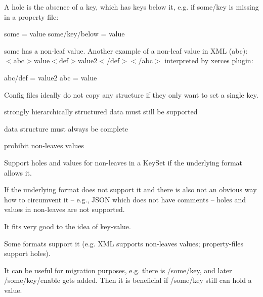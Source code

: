 A hole is the absence of a key, which has keys below it, e.\+g. if {\ttfamily some/key} is missing in a property file\+:


\begin{DoxyCode}
some = value
some/key/below = value
\end{DoxyCode}


{\ttfamily some} has a non-\/leaf value. Another example of a non-\/leaf value in X\+ML ({\ttfamily abc})\+: {\ttfamily $<$abc$>$value$<$def$>$value2$<$/def$>$$<$/abc$>$} interpreted by xerces plugin\+:


\begin{DoxyCode}
abc/def = value2
abc = value
\end{DoxyCode}


Config files ideally do not copy any structure if they only want to set a single key.


\begin{DoxyItemize}
\item strongly hierarchically structured data must still be supported
\end{DoxyItemize}


\begin{DoxyItemize}
\item data structure must always be complete
\item prohibit non-\/leaves values
\end{DoxyItemize}

Support holes and values for non-\/leaves in a Key\+Set if the underlying format allows it.

If the underlying format does not support it and there is also not an obvious way how to circumvent it -- e.\+g., J\+S\+ON which does not have comments -- holes and values in non-\/leaves are not supported.


\begin{DoxyItemize}
\item It fits very good to the idea of key-\/value.
\item Some formats support it (e.\+g. X\+ML supports non-\/leaves values; property-\/files support holes).
\item It can be useful for migration purposes, e.\+g. there is {\ttfamily /some/key}, and later {\ttfamily /some/key/enable} gets added. Then it is beneficial if {\ttfamily /some/key} still can hold a value.
\end{DoxyItemize}